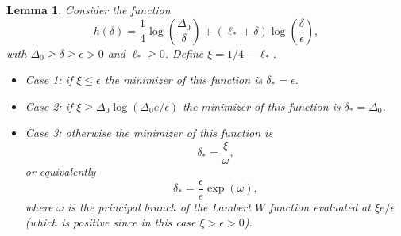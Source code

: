 \documentclass[10pt,a4paper]{amsart}
\newtheorem{lemma}{Lemma}
\begin{document}
\begin{lemma}
\label{lem:lambert}
Consider the function
\begin{equation}
\label{eq:lambertW}
h(\delta) =
    \frac{1}{4}\log\left(\frac{\Delta_{0}}{\delta}\right) + (\ell_* + \delta)\log\left(\frac{\delta}{\epsilon}\right),
\end{equation}
    with $\Delta_0 \geq \delta \geq \epsilon > 0$ and $\ell_* \geq 0$.
    Define $\xi = 1/4 - \ell_*$. 
    \begin{itemize}
        \item Case 1: if $\xi \leq \epsilon$ the minimizer of this function is $\delta_*=\epsilon$.
        \item Case 2: if $\xi \geq \Delta_0\log(\Delta_0e/\epsilon)$ the minimizer of this function is $\delta_* = \Delta_0$.
        \item Case 3: otherwise the minimizer of this function is 
        \begin{equation}
        \delta_* = \frac{\xi}{\omega},
    \end{equation}
    or equivalently
    \begin{equation}
        \delta_* = \frac{\epsilon}{e}\exp(\omega),
    \end{equation}
        where $\omega$ is the principal branch of the Lambert $W$ function evaluated at $\xi e/\epsilon$ (which is positive since in this case $\xi > \epsilon > 0$).
    \end{itemize}
\end{lemma}
\end{document}
